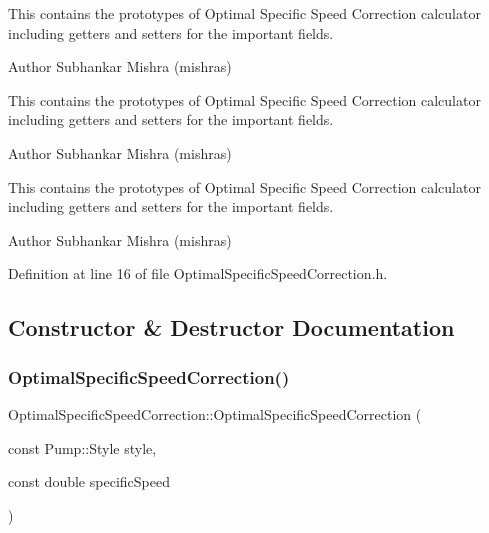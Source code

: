 This contains the prototypes of Optimal Specific Speed Correction calculator including getters and setters for the important fields.

\begin{DoxyAuthor}{Author}
Subhankar Mishra (mishras) 
\end{DoxyAuthor}


This contains the prototypes of Optimal Specific Speed Correction calculator including getters and setters for the important fields.

\begin{DoxyAuthor}{Author}
Subhankar Mishra (mishras) 
\end{DoxyAuthor}


This contains the prototypes of Optimal Specific Speed Correction calculator including getters and setters for the important fields.

\begin{DoxyAuthor}{Author}
Subhankar Mishra (mishras) 
\end{DoxyAuthor}


Definition at line 16 of file Optimal\+Specific\+Speed\+Correction.\+h.



\subsection{Constructor \& Destructor Documentation}
\mbox{\label{class_optimal_specific_speed_correction_a8af4972dfd79881d9c9c9b0f47d922b9}} 
\subsubsection{\texorpdfstring{Optimal\+Specific\+Speed\+Correction()}{OptimalSpecificSpeedCorrection()}\hspace{0.1cm}{\footnotesize\ttfamily [1/3]}}
{\footnotesize\ttfamily Optimal\+Specific\+Speed\+Correction\+::\+Optimal\+Specific\+Speed\+Correction (\begin{DoxyParamCaption}\item[{const Pump\+::\+Style}]{style,  }\item[{const double}]{specific\+Speed }\end{DoxyParamCaption})\hspace{0.3cm}{\ttfamily [inline]}}

